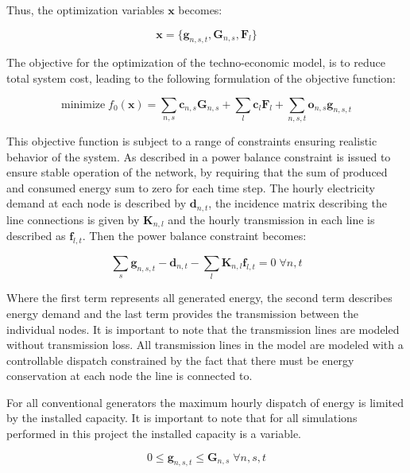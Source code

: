 Thus, the optimization variables $\mathbf{x}$ becomes: 

\begin{equation}\label{eq:Optimization_variables}
	\mathbf{x} = \{ \mathbf{g}_{n,s,t} , \mathbf{G}_{n,s} , \mathbf{F}_{l} \}
\end{equation}

The objective for the optimization of the techno-economic model, is to reduce total system cost, leading to the following formulation of the objective function: 

\begin{equation}
\text{minimize} \; f_0(\mathbf{x}) =  \sum_{n,s} \mathbf{c}_{n,s} \mathbf{G}_{n,s} + \sum_l \mathbf{c}_l \mathbf{F}_l + \sum_{n,s,t} \mathbf{o}_{n,s} \mathbf{g}_{n,s,t} 
\end{equation}{}

This objective function is subject to a range of constraints ensuring realistic behavior of the system. As described in \cite{PyPSA_euro_30_model} a power balance constraint is issued to ensure stable operation of the network, by requiring that the sum of produced and consumed energy sum to zero for each time step. The hourly electricity demand at each node is described by $\mathbf{d}_{n,t}$, the incidence matrix describing the line connections is given by $\mathbf{K}_{n,l}$ and the hourly transmission in each line is described as $\mathbf{f}_{l,t}$. Then the power balance constraint becomes: 

\begin{equation} \label{eq:equality_constraint}
\sum_s \mathbf{g}_{n,s,t} - \mathbf{d}_{n,t} - \sum_l \mathbf{K}_{n,l} \mathbf{f}_{l,t} = 0  \; \forall n,t
\end{equation}

Where the first term represents all generated energy, the second term describes energy demand and the last term provides the transmission between the individual nodes. It is important to note that the transmission lines are modeled without transmission loss. All transmission lines in the model are modeled with a controllable dispatch constrained by the fact that there must be energy conservation at each node the line is connected to.

For all conventional generators the maximum hourly dispatch of energy is limited by the installed capacity. It is important to note that for all simulations performed in this project the installed capacity is a variable. 

\begin{equation}
0\leq \mathbf{g}_{n,s,t} \leq \mathbf{G}_{n,s} \; \forall n,s,t
\end{equation}

